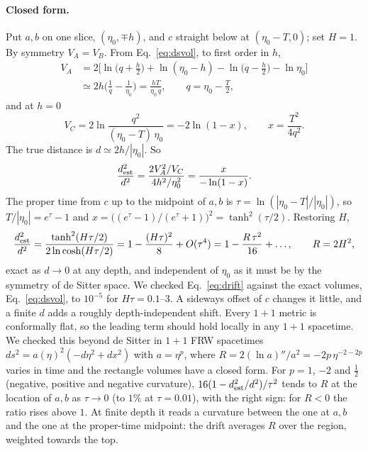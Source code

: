 \documentclass[11pt,a4paper]{article}
\begin{document}
\paragraph{Closed form.} Put $a,b$ on one slice, $(\eta_0,\mp h)$, and $c$ straight below at $(\eta_0-T,0)$; set $H=1$. By symmetry $V_A=V_B$. From Eq.~\eqref{eq:dsvol}, to first order in $h$,
\begin{equation}
\begin{aligned}
V_A&=2\Big[\ln\big(q+\tfrac h2\big)+\ln(\eta_0-h)-\ln\big(q-\tfrac h2\big)-\ln\eta_0\Big]\\
&\simeq2h\Big(\frac1q-\frac1{\eta_0}\Big)=\frac{hT}{\eta_0\,q},\qquad q=\eta_0-\tfrac T2,
\end{aligned}
\end{equation}
and at $h=0$
\begin{equation}
V_C=2\ln\frac{q^2}{(\eta_0-T)\,\eta_0}=-2\ln(1-x),\qquad x=\frac{T^2}{4q^2}.
\end{equation}
The true distance is $d\simeq2h/|\eta_0|$. So
\begin{equation}
\frac{d^2_{\rm est}}{d^2}=\frac{2V_A^2/V_C}{4h^2/\eta_0^2}=\frac{x}{-\ln(1-x)}.
\end{equation}
The proper time from $c$ up to the midpoint of $a,b$ is $\tau=\ln(|\eta_0-T|/|\eta_0|)$, so $T/|\eta_0|=e^{\tau}-1$ and $x=\big((e^\tau-1)/(e^\tau+1)\big)^2=\tanh^2(\tau/2)$. Restoring $H$,
\begin{equation}
\frac{d^2_{\rm est}}{d^2}=\frac{\tanh^2(H\tau/2)}{2\ln\cosh(H\tau/2)}=1-\frac{(H\tau)^2}{8}+O(\tau^4)=1-\frac{R\,\tau^2}{16}+\dots,\qquad R=2H^2,
\label{eq:drift}
\end{equation}
exact as $d\to0$ at any depth, and independent of $\eta_0$ as it must be by the symmetry of de Sitter space. We checked Eq.~\eqref{eq:drift} against the exact volumes, Eq.~\eqref{eq:dsvol}, to $10^{-5}$ for $H\tau=0.1$--$3$. A sideways offset of $c$ changes it little, and a finite $d$ adds a roughly depth-independent shift. Every $1+1$ metric is conformally flat, so the leading term should hold locally in any $1+1$ spacetime. We checked this beyond de Sitter in $1+1$ FRW spacetimes $ds^2=a(\eta)^2(-d\eta^2+dx^2)$ with $a=\eta^p$, where $R=2(\ln a)''/a^2=-2p\,\eta^{-2-2p}$ varies in time and the rectangle volumes have a closed form. For $p=1$, $-2$ and $\tfrac12$ (negative, positive and negative curvature), $16(1-d^2_{\rm est}/d^2)/\tau^2$ tends to $R$ at the location of $a,b$ as $\tau\to0$ (to $1\%$ at $\tau=0.01$), with the right sign: for $R<0$ the ratio rises above $1$. At finite depth it reads a curvature between the one at $a,b$ and the one at the proper-time midpoint: the drift averages $R$ over the region, weighted towards the top.
\end{document}

